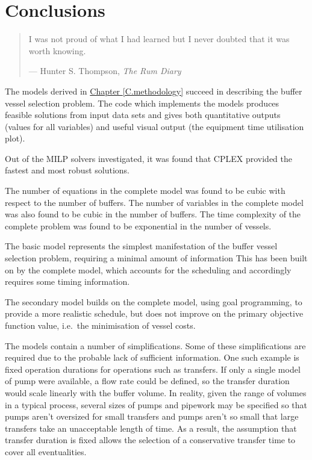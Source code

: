%
%
%
%

\chapter{Conclusions}\label{C.conclusions}

\begin{quote}
I was not proud of what I had learned but I never doubted that it was worth
knowing.

\hspace{2cm}--- Hunter S. Thompson, \emph{The Rum Diary}
\end{quote}

The models derived in \hyperref[C.methodology]{Chapter \ref*{C.methodology}}
succeed in describing the buffer vessel selection problem.
The code which implements the models produces feasible
solutions from input data sets and gives both quantitative outputs (values for
all variables) and useful visual output (the equipment time utilisation plot).

Out of the MILP solvers investigated, it was found that CPLEX provided the
fastest and most robust solutions.

The number of equations in the complete model was found to be cubic with
respect to the number of buffers.  The number of variables in the complete
model was also found to be cubic in the number of buffers.
The time complexity of the complete problem was found to be exponential in
the number of vessels.

The basic model represents the simplest manifestation of the buffer vessel
selection problem, requiring a minimal amount of information
This has been built on by the complete model, which accounts for the scheduling
and accordingly requires some timing information.

The secondary model builds on the complete model, using goal programming, to
provide a more realistic schedule, but does not improve on the primary
objective function value, i.e.\ the minimisation of vessel costs.

The models contain a number of simplifications.
Some of these simplifications are required due to the probable lack of
sufficient information.
One such example is fixed operation durations for operations such as
transfers.
If only a single model of pump were available, a flow rate could be
defined, so the transfer duration would scale linearly with the buffer volume.
In reality, given the range of volumes in a typical process, several sizes of
pumps and pipework may be specified so that pumps aren't oversized for small
transfers and pumps aren't so small that large transfers take an unacceptable
length of time.  As a result, the assumption that transfer duration is fixed
allows the selection of a conservative transfer time to cover all
eventualities.

